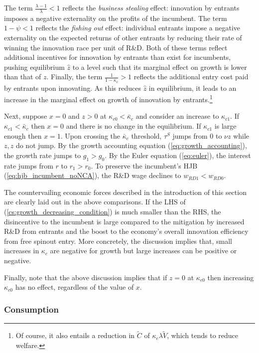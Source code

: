 \documentclass[11pt,english]{article}
\theoremstyle{remark}
\begin{document}
The term $\frac{\lambda - 1}{\lambda} < 1$ reflects the \textit{business stealing} effect: innovation by entrants imposes a negative externality on the profits of the incumbent. The term $1-\psi < 1$ reflects the \textit{fishing out} effect: individual entrants impose a negative externality on the expected returns of other entrants by reducing their rate of winning the innovation race per unit of R\&D. Both of these terms reflect additional incentives for innovation by entrants than exist for incumbents, pushing equilibrium $\hat{z}$ to a level such that its marginal effect on growth is lower than that of $z$. Finally, the term $\frac{1}{1-\kappa_e} > 1$ reflects the additional entry cost paid by entrants upon innovating. As this reduces $\hat{z}$ in equilibrium, it leads to an increase in the marginal effect on growth of innovation by entrants.\footnote{Of course, it also entails a reduction in $\tilde{C}$ of $\kappa_e \lambda \tilde{V}$, which tends to reduce welfare.}

Next, suppose $x = 0$ and $z > 0$ at $\kappa_{c0} < \bar{\kappa}_c$ and consider an increase to $\kappa_{c1}$. If $\kappa_{c1} < \bar{\kappa}_c$ then $x = 0$ and there is no change in the equilibrium. If $\kappa_{c1}$ is large enough then $x = 1$. Upon crossing the $\bar{\kappa}_c$ threshold, $\tau^S$ jumps from $0$ to $\nu z$ while $z,\hat{z}$ do not jump. By the growth accounting equation (\ref{eq:growth_accounting}), the growth rate jumps to $g_1 > g_0$. By the Euler equation (\ref{eq:euler}), the interest rate jumps from $r$ to $r_1>r_0$. To preserve the incumbent's HJB (\ref{eq:hjb_incumbent_noNCA}), the R\&D wage declines to $w_{RD1} < w_{RD0}$.

The countervailing economic forces described in the introduction of this section are clearly laid out in the above comparisons. If the LHS of (\ref{cs:growth_decreasing_condition}) is much smaller than the RHS, the disincentive to the incumbent is large compared to the mitigation by increased R\&D from entrants and the boost to the economy's overall innovation efficiency from free spinout entry. More concretely, the discussion implies that, small increases in $\kappa_c$ are negative for growth but large increases can be positive or negative.

Finally, note that the above discussion implies that if $z = 0$ at $\kappa_{c0}$ then increasing $\kappa_{c0}$ has no effect, regardless of the value of $x$. 

\subsubsection{Consumption}\label{cs:consumption1}
\end{document}

